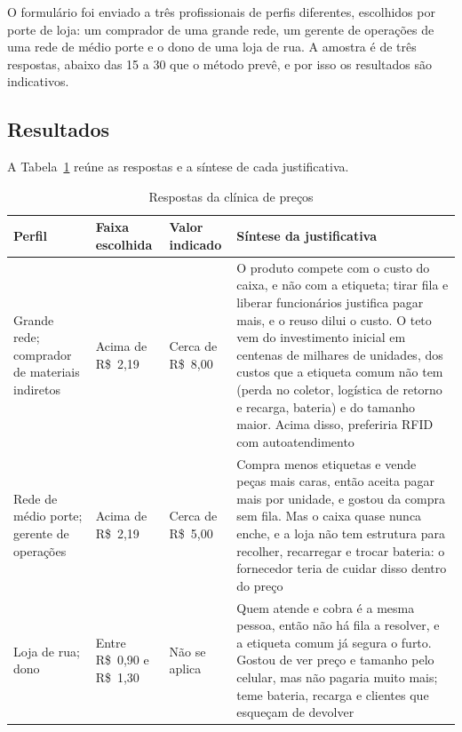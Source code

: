 O formulário foi enviado a três profissionais de perfis diferentes, escolhidos por porte de loja: um comprador de uma grande rede, um gerente de operações de uma rede de médio porte e o dono de uma loja de rua. A amostra é de três respostas, abaixo das 15 a 30 que o método prevê, e por isso os resultados são indicativos.

\subsection{Resultados}
\label{subsec:escala_resultados}

A Tabela~\ref{tab:escala_respostas} reúne as respostas e a síntese de cada justificativa.

\begin{table}[H]
    \centering
    \caption{Respostas da clínica de preços}
    \label{tab:escala_respostas}
    \footnotesize
    \renewcommand{\arraystretch}{1.25}
    \begin{tabularx}{\textwidth}{@{}
        >{\RaggedRight\arraybackslash}p{2.6cm}
        >{\RaggedRight\arraybackslash}p{2.2cm}
        >{\RaggedRight\arraybackslash}p{1.6cm}
        >{\RaggedRight\arraybackslash}X@{}}
        \toprule
        \textbf{Perfil} & \textbf{Faixa escolhida} & \textbf{Valor indicado} & \textbf{Síntese da justificativa} \\
        \midrule
        Grande rede; comprador de materiais indiretos & Acima de R\$~2,19 & Cerca de R\$~8,00 & O produto compete com o custo do caixa, e não com a etiqueta; tirar fila e liberar funcionários justifica pagar mais, e o reuso dilui o custo. O teto vem do investimento inicial em centenas de milhares de unidades, dos custos que a etiqueta comum não tem (perda no coletor, logística de retorno e recarga, bateria) e do tamanho maior. Acima disso, preferiria RFID com autoatendimento \\
        Rede de médio porte; gerente de operações & Acima de R\$~2,19 & Cerca de R\$~5,00 & Compra menos etiquetas e vende peças mais caras, então aceita pagar mais por unidade, e gostou da compra sem fila. Mas o caixa quase nunca enche, e a loja não tem estrutura para recolher, recarregar e trocar bateria: o fornecedor teria de cuidar disso dentro do preço \\
        Loja de rua; dono & Entre R\$~0,90 e R\$~1,30 & Não se aplica & Quem atende e cobra é a mesma pessoa, então não há fila a resolver, e a etiqueta comum já segura o furto. Gostou de ver preço e tamanho pelo celular, mas não pagaria muito mais; teme bateria, recarga e clientes que esqueçam de devolver \\
        \bottomrule
    \end{tabularx}
\end{table}

